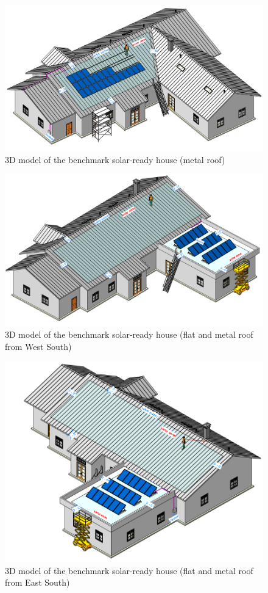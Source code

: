\documentclass[]{article}
\begin{document}
\begin{figure}
\centering
\includegraphics{3d_1.png}
\caption{3D model of the benchmark solar-ready house (metal roof)}
\end{figure}

\begin{figure}
\centering
\includegraphics{3d_3.png}
\caption{3D model of the benchmark solar-ready house (flat and metal
roof from West South)}
\end{figure}

\begin{figure}
\centering
\includegraphics{3d_4.png}
\caption{3D model of the benchmark solar-ready house (flat and metal
roof from East South)}
\end{figure}
\end{document}
